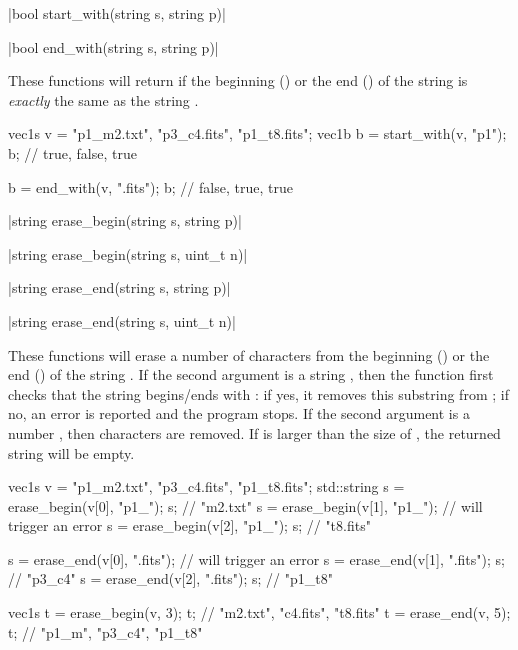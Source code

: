 {\funcitem \vectorfunc \cppinline|bool start_with(string s, string p)| 

\vectorfunc \cppinline|bool end_with(string s, string p)| 

These functions will return \cpptrue if the beginning () or the end () of the string  is \emph{exactly} the same as the string .

\begin{example}
\begin{cppcode}
vec1s v = {"p1_m2.txt", "p3_c4.fits", "p1_t8.fits"};
vec1b b = start_with(v, "p1");
b; // {true, false, true}

b = end_with(v, ".fits");
b; // {false, true, true}
\end{cppcode}
\end{example}

\funcitem \vectorfunc \cppinline|string erase_begin(string s, string p)| 

\vectorfunc \cppinline|string erase_begin(string s, uint_t n)|

\vectorfunc \cppinline|string erase_end(string s, string p)| 

\vectorfunc \cppinline|string erase_end(string s, uint_t n)|

These functions will erase a number of characters from the beginning () or the end () of the string . If the second argument is a string , then the function first checks that the string begins/ends with : if yes, it removes this substring from ; if no, an error is reported and the program stops. If the second argument is a number , then  characters are removed. If  is larger than the size of , the returned string will be empty.

\begin{example}
\begin{cppcode}
vec1s v = {"p1_m2.txt", "p3_c4.fits", "p1_t8.fits"};
std::string s = erase_begin(v[0], "p1_");
s; // "m2.txt"
s = erase_begin(v[1], "p1_");
// will trigger an error
s = erase_begin(v[2], "p1_");
s; // "t8.fits"

s = erase_end(v[0], ".fits");
// will trigger an error
s = erase_end(v[1], ".fits");
s; // "p3_c4"
s = erase_end(v[2], ".fits");
s; // "p1_t8"

vec1s t = erase_begin(v, 3);
t; // {"m2.txt", "c4.fits", "t8.fits"}
t = erase_end(v, 5);
t; // {"p1_m", "p3_c4", "p1_t8"}
\end{cppcode}
\end{example}

}
